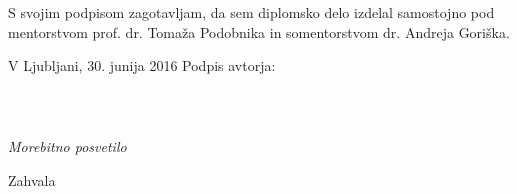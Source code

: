 \vspace{1.5cm}
S svojim podpisom zagotavljam, da sem diplomsko delo izdelal samostojno pod mentorstvom 
prof. dr. Tomaža Podobnika in somentorstvom dr. Andreja Goriška.

\vspace{1cm}
V Ljubljani, 30. junija 2016 \hspace{2.5cm} Podpis avtorja:
\newpage

\ \thispagestyle{empty}
\newpage

\thispagestyle{empty}

$\;$ 

\vspace{5cm}
\hfill {\Large \em Morebitno posvetilo}
\thispagestyle{empty}

\vfill
Zahvala
\newpage

\newpage

\renewcommand\thepage{} 
\tableofcontents 
\renewcommand\thepage{\arabic{page}}
\thispagestyle{empty}


\newpage

\mbox{}
\thispagestyle{empty}
\newpage

\setcounter{page}{1}


\thispagestyle{empty}
\newpage

